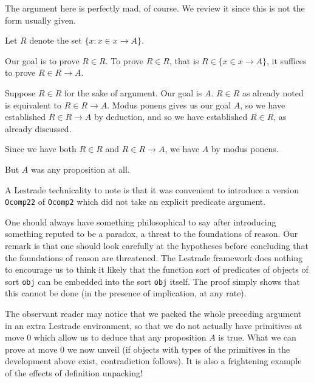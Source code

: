 \documentclass[12pt]{article}
\begin{document}
The argument here is perfectly mad, of course.  We review it since this is not the form usually given.

Let $R$ denote the set $\{x:x \in x \rightarrow A\}$.

Our goal is to prove $R \in R$.  To prove $R \in R$, that is $R \in \{x \in x \rightarrow A\}$, it suffices to prove $R \in R \rightarrow A$.

Suppose $R \in R$ for the sake of argument.  Our goal is $A$.  $R \in R$ as already noted is equivalent to $R \in R \rightarrow A$.
Modus ponens gives us our goal $A$, so we have established $R \in R \rightarrow A$ by deduction, and so we have established $R \in R$,
as already discussed.

Since we have both $R \in R$ and $R \in R \rightarrow A$, we have $A$ by modus ponens.

But $A$ was any proposition at all.

A Lestrade technicality to note is that it was convenient to introduce a version {\tt Ocomp22} of {\tt Ocomp2}  which did not take an explicit predicate argument.

One should always have something philosophical to say after introducing something reputed to be a paradox, a threat to the foundations of reason.  Our remark is that one should look carefully at the hypotheses before concluding that the foundations of reason are threatened.  The Lestrade framework does nothing to encourage us to think it likely that the function sort of predicates of objects of sort {\tt obj} can be embedded into the sort {\tt obj} itself.  The proof simply shows that this cannot be done (in the presence of implication, at any rate).

The observant reader may notice that we packed the whole preceding argument in an extra Lestrade environment, so that we do not actually have primitives at move 0 which allow us to deduce that any proposition $A$ is true.  What we can prove at move 0 we now unveil (if objects with types of the primitives in the development above exist, contradiction follows).  It is also a frightening example of the effects of definition unpacking!
\end{document}
